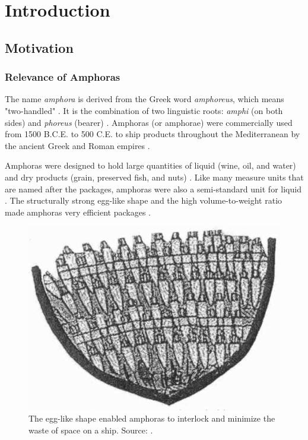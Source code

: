 \documentclass[a4paper, 11pt, oneside]{article}
\begin{document}
\newpage

\tableofcontents

\clearpage
{}

\section{Introduction}

\subsection{Motivation}

\subsubsection{Relevance of Amphoras}

The name \textit{amphora} is derived from the Greek word \textit{amphoreus}, which means "two-handled"
\cite{harper2001online, twede2002commercial, will1977ancient}. It is the combination of two linguistic roots:
\textit{amphi} (on both sides) and \textit{phoreus} (bearer)
\cite{harper2001online, twede2002commercial, will1977ancient}. Amphoras (or amphorae) were commercially used from
1500 B.C.E. to 500 C.E. to ship products throughout the Mediterranean by the ancient Greek and Roman empires
\cite{twede2002commercial, worldhistory}.

Amphoras were designed to hold large quantities of liquid (wine, oil, and water) and dry products
(grain, preserved fish, and nuts) \cite{twede2002commercial, foley2012aspects, grace1979amphoras}. Like many measure
units that are named after the packages, amphoras were also a semi-standard unit for liquid \cite{twede2002commercial}.
The structurally strong egg-like shape and the high volume-to-weight ratio made amphoras very efficient packages
\cite{twede2002commercial, worldhistory}.

\begin{figure}[ht]
  \begin{center}
    \includegraphics[width=.6\textwidth]{amphora_stowage_aboard_ship.png}
  \end{center}
  \caption{The egg-like shape enabled amphoras to interlock and minimize the waste of space on a ship.
  Source: \cite{twede2002commercial}.}
\end{figure}
\end{document}
